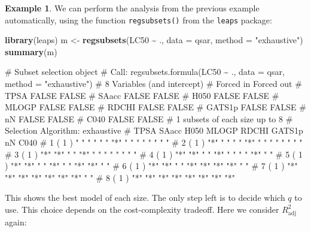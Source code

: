 \documentclass[
  a4paper,
]{article}
\newenvironment{Shaded}{\begin{snugshade}}{\end{snugshade}}
\newcommand{\AttributeTok}[1]{\textcolor[rgb]{0.13,0.29,0.53}{#1}}
\newcommand{\FunctionTok}[1]{\textcolor[rgb]{0.13,0.29,0.53}{\textbf{#1}}}
\newcommand{\NormalTok}[1]{#1}
\newcommand{\OtherTok}[1]{\textcolor[rgb]{0.56,0.35,0.01}{#1}}
\newcommand{\SpecialCharTok}[1]{\textcolor[rgb]{0.81,0.36,0.00}{\textbf{#1}}}
\newcommand{\StringTok}[1]{\textcolor[rgb]{0.31,0.60,0.02}{#1}}
\theoremstyle{definition}
\theoremstyle{definition}
\newtheorem{example}{Example}[section]
\theoremstyle{definition}
\theoremstyle{definition}
\theoremstyle{remark}
\begin{document}
\begin{example}
We can perform the analysis from the previous example automatically,
using the function \texttt{regsubsets()} from the \texttt{leaps} package:

\begin{Shaded}
\begin{Highlighting}[]
\FunctionTok{library}\NormalTok{(leaps)}
\NormalTok{m }\OtherTok{\textless{}{-}} \FunctionTok{regsubsets}\NormalTok{(LC50 }\SpecialCharTok{\textasciitilde{}}\NormalTok{ ., }\AttributeTok{data =}\NormalTok{ qsar,}
                \AttributeTok{method =} \StringTok{"exhaustive"}\NormalTok{)}
\FunctionTok{summary}\NormalTok{(m)}
\end{Highlighting}
\end{Shaded}

\begin{Shaded}
\begin{Highlighting}[]
\NormalTok{\# Subset selection object}
\NormalTok{\# Call: regsubsets.formula(LC50 \textasciitilde{} ., data = qsar, method = "exhaustive")}
\NormalTok{\# 8 Variables  (and intercept)}
\NormalTok{\#        Forced in Forced out}
\NormalTok{\# TPSA       FALSE      FALSE}
\NormalTok{\# SAacc      FALSE      FALSE}
\NormalTok{\# H050       FALSE      FALSE}
\NormalTok{\# MLOGP      FALSE      FALSE}
\NormalTok{\# RDCHI      FALSE      FALSE}
\NormalTok{\# GATS1p     FALSE      FALSE}
\NormalTok{\# nN         FALSE      FALSE}
\NormalTok{\# C040       FALSE      FALSE}
\NormalTok{\# 1 subsets of each size up to 8}
\NormalTok{\# Selection Algorithm: exhaustive}
\NormalTok{\#          TPSA SAacc H050 MLOGP RDCHI GATS1p nN  C040}
\NormalTok{\# 1  ( 1 ) " "  " "   " "  "*"   " "   " "    " " " " }
\NormalTok{\# 2  ( 1 ) "*"  " "   " "  "*"   " "   " "    " " " " }
\NormalTok{\# 3  ( 1 ) "*"  "*"   " "  "*"   " "   " "    " " " " }
\NormalTok{\# 4  ( 1 ) "*"  "*"   " "  "*"   " "   " "    "*" " " }
\NormalTok{\# 5  ( 1 ) "*"  "*"   " "  "*"   " "   "*"    "*" " " }
\NormalTok{\# 6  ( 1 ) "*"  "*"   " "  "*"   "*"   "*"    "*" " " }
\NormalTok{\# 7  ( 1 ) "*"  "*"   "*"  "*"   "*"   "*"    "*" " " }
\NormalTok{\# 8  ( 1 ) "*"  "*"   "*"  "*"   "*"   "*"    "*" "*"}
\end{Highlighting}
\end{Shaded}

This shows the best model of each size. The only step left is
to decide which \(q\) to use. This choice depends on the cost-complexity
tradeoff. Here we consider \(R^2_\mathrm{adj}\) again:


\end{example}
\end{document}
